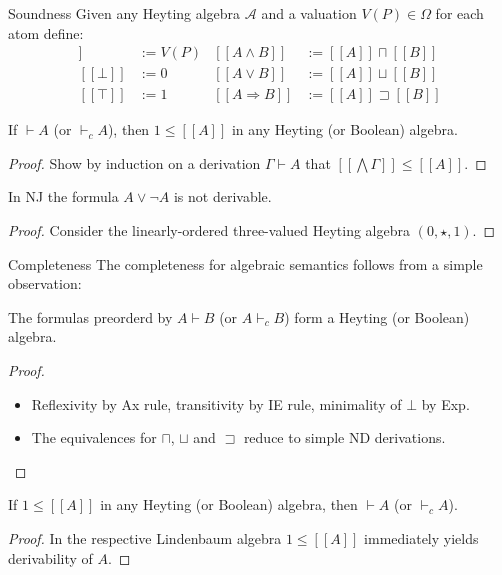\documentclass[xcolor=dvipsnames,aspectratio=169,handout]{beamer}
\renewcommand{\to}{\Rightarrow}
\renewcommand{\AA}{\mathcal A}
\newcommand{\lsem}{[\![}
\newcommand{\rsem}{]\!]}
\begin{document}
\begin{frame}{Soundness}
	\pause
	Given any Heyting algebra $\AA$ and a valuation $V(P)\in \Omega$ for each atom define:
	\begin{align*}
		\lsem P\rsem &:= V(P)& \lsem A\land B\rsem &:= \lsem A\rsem \sqcap \lsem B\rsem\\
		\lsem \bot\rsem &:= 0& \lsem A\lor B\rsem &:= \lsem A\rsem \sqcup \lsem B\rsem\\
		\lsem \top\rsem &:= 1& \lsem A\to B\rsem &:= \lsem A\rsem \sqsupset \lsem B\rsem
	\end{align*}
	\vspace{-0.5cm}
	\pause
	\begin{theorem}[Soundness]
		If $\vdash A$ (or $\vdash_c A$), then $1\le \lsem A\rsem$ in any Heyting (or Boolean) algebra.
	\end{theorem}
	\vspace{-0.2cm}
	\pause
	\begin{proof}
		Show by induction on a derivation $\Gamma\vdash A$ that $\lsem \bigwedge\Gamma\rsem \le \lsem A\rsem$.
	\end{proof}
	\pause
	\begin{corollary}
		In NJ the formula $A\lor \neg A$ is not derivable.
	\end{corollary}
	\vspace{-0.2cm}
	\pause
	\begin{proof}
		Consider the linearly-ordered three-valued Heyting algebra $(0,\star,1)$.
	\end{proof}
\end{frame}

\begin{frame}{Completeness}
	\pause
	The completeness for algebraic semantics follows from a simple observation:
	\pause
	\begin{fact}
		The formulas preorderd by $A\vdash B$ (or $A\vdash_c B$) form a Heyting (or Boolean) algebra.
	\end{fact}
	\vspace{-0.2cm}
	\pause
	\begin{proof}
		\begin{itemize}
			\pause
			\item
			Reflexivity by Ax rule, transitivity by IE rule, minimality of $\bot$ by Exp.
			\pause
			\item
			The equivalences for $\sqcap$, $\sqcup$ and $\sqsupset$ reduce to simple ND derivations.
			\qedhere
		\end{itemize}
	\end{proof}
	\pause
	\begin{corollary}[Completeness]
		If $1\le \lsem A\rsem$ in any Heyting (or Boolean) algebra, then $\vdash A$ (or $\vdash_c A$).
	\end{corollary}
	\vspace{-0.2cm}
	\pause
	\begin{proof}
		In the respective Lindenbaum algebra $1\le \lsem A\rsem$ immediately yields derivability of $A$.
	\end{proof}
\end{frame}
\end{document}
